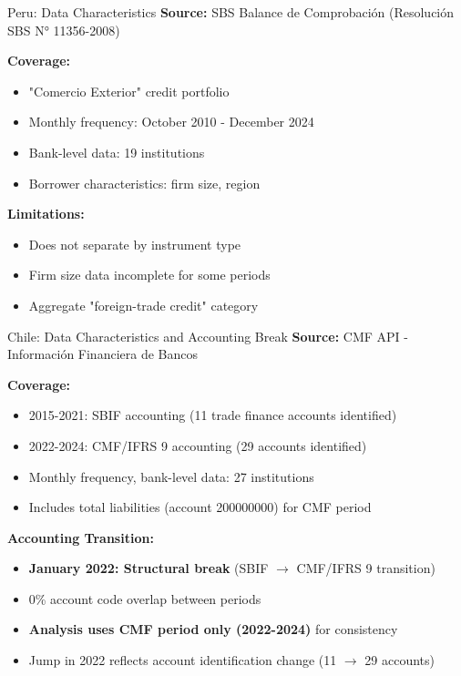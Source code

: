 \documentclass[aspectratio=169,11pt]{beamer}
\begin{document}
\begin{frame}{Peru: Data Characteristics}
\textbf{Source:} SBS Balance de Comprobación (Resolución SBS N° 11356-2008)

\vspace{0.3cm}
\textbf{Coverage:}
\begin{itemize}
    \item "Comercio Exterior" credit portfolio
    \item Monthly frequency: October 2010 - December 2024
    \item Bank-level data: 19 institutions
    \item Borrower characteristics: firm size, region
\end{itemize}

\vspace{0.3cm}
\textbf{Limitations:}
\begin{itemize}
    \item Does not separate by instrument type
    \item Firm size data incomplete for some periods
    \item Aggregate "foreign-trade credit" category
\end{itemize}
\end{frame}

\begin{frame}{Chile: Data Characteristics and Accounting Break}
\textbf{Source:} CMF API - Información Financiera de Bancos

\vspace{0.3cm}
\textbf{Coverage:}
\begin{itemize}
    \item 2015-2021: SBIF accounting (11 trade finance accounts identified)
    \item 2022-2024: CMF/IFRS 9 accounting (29 accounts identified)
    \item Monthly frequency, bank-level data: 27 institutions
    \item Includes total liabilities (account 200000000) for CMF period
\end{itemize}

\vspace{0.3cm}
\textbf{Accounting Transition:}
\begin{itemize}
    \item \textbf{January 2022: Structural break} (SBIF $\rightarrow$ CMF/IFRS 9 transition)
    \item 0\% account code overlap between periods
    \item \textbf{Analysis uses CMF period only (2022-2024)} for consistency
    \item Jump in 2022 reflects account identification change (11 $\rightarrow$ 29 accounts)
\end{itemize}
\end{frame}
\end{document}
